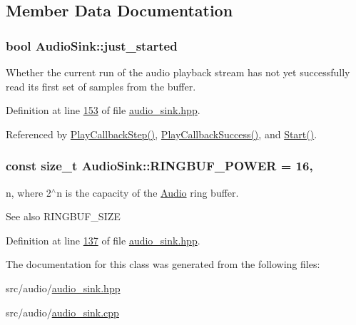 \subsection{Member Data Documentation}
\hypertarget{classAudioSink_a00cbaaf2b4fcf5d9acb614b909234196}{
\subsubsection[{just\+\_\+started}]{\setlength{\rightskip}{0pt plus 5cm}bool Audio\+Sink\+::just\+\_\+started\hspace{0.3cm}{\ttfamily [private]}}}\label{classAudioSink_a00cbaaf2b4fcf5d9acb614b909234196}


Whether the current run of the audio playback stream has not yet successfully read its first set of samples from the buffer. 



Definition at line \hyperlink{audio__sink_8hpp_source_l00153}{153} of file \hyperlink{audio__sink_8hpp_source}{audio\+\_\+sink.\+hpp}.



Referenced by \hyperlink{audio__sink_8cpp_source_l00126}{Play\+Callback\+Step()}, \hyperlink{audio__sink_8cpp_source_l00144}{Play\+Callback\+Success()}, and \hyperlink{audio__sink_8cpp_source_l00037}{Start()}.

\hypertarget{classAudioSink_a152e5a388d4570211509a2a19a38c321}{
\subsubsection[{R\+I\+N\+G\+B\+U\+F\+\_\+\+P\+O\+W\+E\+R}]{\setlength{\rightskip}{0pt plus 5cm}const size\+\_\+t Audio\+Sink\+::\+R\+I\+N\+G\+B\+U\+F\+\_\+\+P\+O\+W\+E\+R = 16\hspace{0.3cm}{\ttfamily [static]}, {\ttfamily [private]}}}\label{classAudioSink_a152e5a388d4570211509a2a19a38c321}


n, where 2$^\wedge$n is the capacity of the \hyperlink{classAudio}{Audio} ring buffer. 

\begin{DoxySeeAlso}{See also}
R\+I\+N\+G\+B\+U\+F\+\_\+\+S\+I\+Z\+E 
\end{DoxySeeAlso}


Definition at line \hyperlink{audio__sink_8hpp_source_l00137}{137} of file \hyperlink{audio__sink_8hpp_source}{audio\+\_\+sink.\+hpp}.



The documentation for this class was generated from the following files\+:\begin{DoxyCompactItemize}
\item 
src/audio/\hyperlink{audio__sink_8hpp}{audio\+\_\+sink.\+hpp}\item 
src/audio/\hyperlink{audio__sink_8cpp}{audio\+\_\+sink.\+cpp}\end{DoxyCompactItemize}
